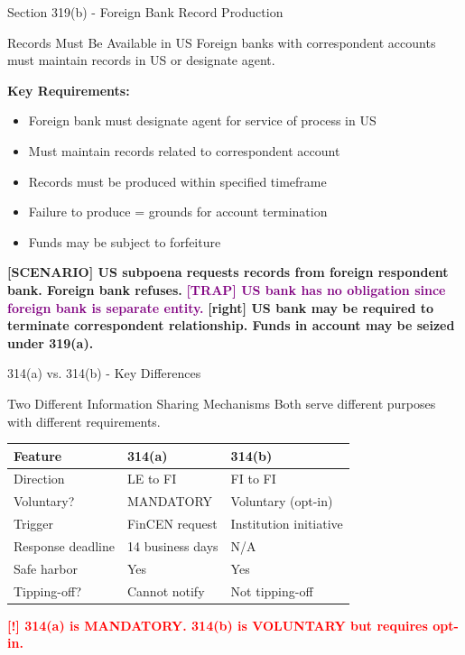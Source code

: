 \documentclass[11pt,a4paper]{beamer}
\newcommand{\redflag}[1]{\textcolor{red}{\textbf{[!] #1}}}
\newcommand{\trap}[1]{\textcolor{purple}{\textbf{[TRAP] #1}}}
\newcommand{\correct}[1]{\textcolor{green!50!black}{\textbf{[right] #1}}}
\newcommand{\scenario}[1]{\textcolor{blue!70!black}{\textbf{[SCENARIO] #1}}}
\begin{document}
\begin{frame}{Section 319(b) - Foreign Bank Record Production}
\begin{block}{Records Must Be Available in US}
Foreign banks with correspondent accounts must maintain records in US or designate agent.
\end{block}
\textbf{Key Requirements:}
\begin{itemize}
\item Foreign bank must designate agent for service of process in US
\item Must maintain records related to correspondent account
\item Records must be produced within specified timeframe
\item Failure to produce = grounds for account termination
\item Funds may be subject to forfeiture
\end{itemize}
\scenario{US subpoena requests records from foreign respondent bank. Foreign bank refuses.}
\trap{US bank has no obligation since foreign bank is separate entity.}
\correct{US bank may be required to terminate correspondent relationship. Funds in account may be seized under 319(a).}
\end{frame}


\begin{frame}{314(a) vs. 314(b) - Key Differences}
\begin{block}{Two Different Information Sharing Mechanisms}
Both serve different purposes with different requirements.
\end{block}
\begin{tabular}{p{}|p{}|p{}}
\hline
\rowcolor{lightgray}
\textbf{Feature} & \textbf{314(a)} & \textbf{314(b)} \\
\hline
Direction & LE to FI & FI to FI \\
Voluntary? & MANDATORY & Voluntary (opt-in) \\
Trigger & FinCEN request & Institution initiative \\
Response deadline & 14 business days & N/A \\
Safe harbor & Yes & Yes \\
Tipping-off? & Cannot notify & Not tipping-off \\
\hline
\end{tabular}
\vspace{0.2cm}
\redflag{314(a) is MANDATORY. 314(b) is VOLUNTARY but requires opt-in.}
\end{frame}
\end{document}
